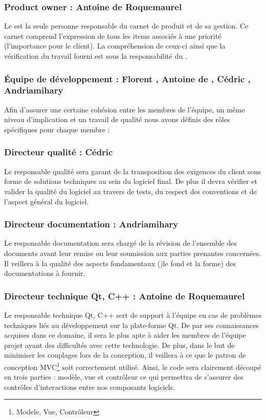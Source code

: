 \subsubsection{Product owner : Antoine de Roquemaurel}
Le  est la seule personne responsable du carnet de produit et de sa gestion. Ce carnet comprend l’expression de tous les items associés
à une priorité (l'importance pour le client). La compréhension de ceux-ci ainsi que la vérification du travail fourni est sous la responsabilité du
.
\subsubsection{Équipe de développement : Florent , Antoine de , Cédric
, Andriamihary }
Afin d’assurer une certaine cohésion entre les membres de l’équipe, un même niveau d’implication et un travail de qualité nous avons
définis des rôles spécifiques pour chaque membre : 
\subsubsection{Directeur qualité : Cédric }
Le responsable qualité sera garant de la transposition des exigences du client sous forme de solutions techniques au sein du logiciel final. De plus il devra vérifier et valider la
qualité du logiciel au travers de tests, du respect des conventions et de l'aspect général du logiciel.

\subsubsection{Directeur documentation : Andriamihary }
Le responsable documentation sera chargé de la révision de l'ensemble des documents avant leur remise ou leur soumission aux parties prenantes
concernées. Il veillera à la qualité des aspects fondamentaux ()le fond et la forme) des documentations à fournir.

\subsubsection{Directeur technique Qt, C++ : Antoine de Roquemaurel}
Le responsable technique Qt, C++ sert de support à l'équipe en cas de problèmes techniques liés au développement sur la plate-forme Qt. De par ses
connaissances acquises dans ce domaine, il sera le plus apte à aider les membres de l'équipe projet ayant des difficultés avec cette technologie.
De plus, dans le but de minimiser les couplages lors de la conception, il veillera à ce que le patron de conception MVC\footnote{Modele, Vue, Contrôleur} soit correctement utilisé. Ainsi, le code
sera clairement découpé en trois parties : modèle, vue et contrôleur ce qui permettra de s’assurer des contrôles d'interactions entre nos composants
logiciels.

